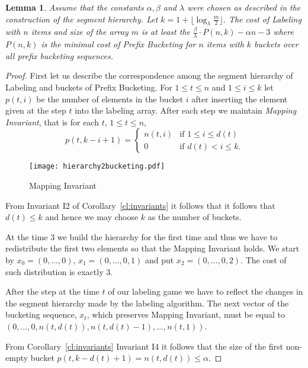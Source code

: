 \documentclass{llncs}
\newtheorem{lemma}[definition]{Lemma}
\newcommand{\hn}[2]{n\left(#1, #2\right)}
\newcommand{\pp}[2]{p\left(#1, #2\right)}
\newcommand{\htz}{3}
\newcommand{\PB}{Prefix Bucketing}
\begin{document}
\begin{lemma}
\label{lm:reduction-cost}
Assume that the constants $\alpha, \beta$ and $\lambda$ were chosen as described in the construction of the segment hierarchy.
Let $k = 1 + \lfloor\log_\lambda \frac{m}{2}\rfloor$.
The cost of Labeling with $n$ items and size of the array $m$ is at least the $\frac{\beta}{\lambda} \cdot P(n, k) - \alpha n - 3$ where $P(n, k)$ is the minimal cost of \PB{} for $n$ items with $k$ buckets over all prefix bucketing sequences.
\end{lemma}
\begin{proof}
First let us describe the correspondence among the segment hierarchy of Labeling and buckets of \PB{}.
For $1 \leq t \leq n$ and $1 \leq i \leq k$ let $\pp{t}{i}$ be the number of elements in the bucket $i$ after inserting the element given at the step $t$ into the labeling array.
After each step we maintain \emph{Mapping Invariant}, that is for each $t$, $1 \leq t \leq n$,
\[
\pp{t}{k - i + 1} =
  \begin{cases}
    \hn{t}{i} & \mbox{if } 1 \leq i \leq d(t) \\
    0 & \mbox{if } d(t) < i \leq k.
  \end{cases}
\]

\begin{figure}
\label{fig:mapping-invariant}
\texttt{[image: hierarchy2bucketing.pdf]}
\caption{Mapping Invariant}
\end{figure}

From Invariant I2 of Corollary~\ref{cl:invariants} it follows that it follows that $d(t) \leq k$ and hence we may choose $k$ as the number of buckets.

At the time $\htz$ we build the hierarchy for the first time and thus we have to redistribute the first two elements so that the Mapping Invariant holds.
We start by $x_0 = (0, \dots, 0)$, $x_1 = (0, \dots, 0, 1)$ and put $x_2 = (0, \dots, 0, 2)$.
The cost of such distribution is exactly 3.

After the step at the time $t$ of our labeling game we have to reflect the changes in the segment hierarchy made by the labeling algorithm. The next vector of the bucketing sequence, $x_t$, which preserves Mapping Invariant, must be equal to $(0, \dots, 0, \hn{t}{d(t)}, \hn{t}{d(t) - 1}, \dots, \hn{t}{1})$.

From Corollary~\ref{cl:invariants} Invariant I4 it follows that the size of the first non-empty bucket $\pp{t}{k - d(t) + 1} = \hn{t}{d(t)} \leq \alpha$.


\end{proof}
\end{document}
